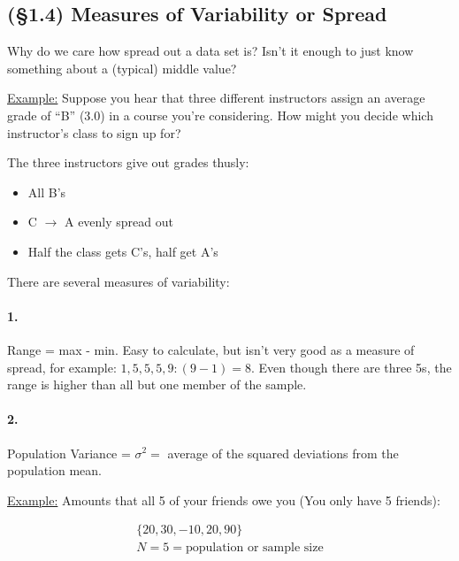 \documentclass[../Notes.tex]{subfiles}
\begin{document}
    \subsection*{(\S1.4) Measures of Variability or Spread}

    Why do we care how spread out a data set is? Isn't it enough to just know something about a (typical) middle value?

    \underline{Example:} Suppose you hear that three different instructors assign an average grade of ``B'' (3.0) in a course you're considering. How might you decide which instructor's class to sign up for?

    The three instructors give out grades thusly:
    \begin{itemize}
        \item All B's
        \item C $\rightarrow$ A evenly spread out
        \item Half the class gets C's, half get A's
    \end{itemize}

    There are several measures of variability:

    \paragraph*{1.} Range = max - min.
    Easy to calculate, but isn't very good as a measure of spread, for example:
    $1, 5, 5, 5, 9: (9 - 1) = 8$. Even though there are three 5s, the range is higher than all but one member of the sample.

    \paragraph*{2.} Population Variance = $\sigma^2 = $ average of the squared deviations from the population mean.

    \underline{Example:} Amounts that all 5 of your friends owe you (You only have 5 friends): 
    
    \begin{equation*}
        \begin{gathered}
            \{ 20, 30, -10, 20, 90 \}                   \\
            N = 5 = \text{population or sample size}    \\
        \end{gathered}
    \end{equation*}
\end{document}
